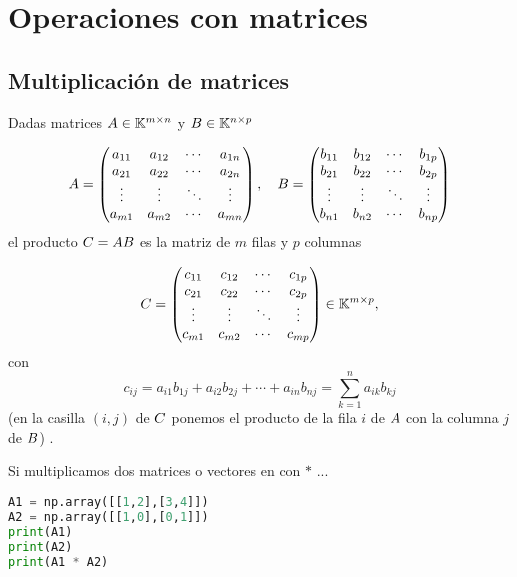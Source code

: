 \section{Operaciones con matrices}

\subsection{Multiplicación de matrices}

Dadas matrices $A \in \mathbb K^{m \times n}$ y $B \in \mathbb K^{n \times p}$

$$
\Ab =\begin{pmatrix}a_{11}&a_{12}&\cdots &a_{1n}\\a_{21}&a_{22}&\cdots &a_{2n}\\\vdots &\vdots &\ddots &\vdots \\a_{m1}&a_{m2}&\cdots &a_{mn}\\\end{pmatrix},\quad  {\Bb} ={\begin{pmatrix}b_{11}&b_{12}&\cdots &b_{1p}\\b_{21}&b_{22}&\cdots &b_{2p}\\\vdots &\vdots &\ddots &\vdots \\b_{n1}&b_{n2}&\cdots &b_{np}\\\end{pmatrix}}
$$ el producto $\Cb = \Ab\Bb$ es la matriz de $m$ filas y $p$ columnas

$$
\Cb =\begin{pmatrix}c_{11}&c_{12}&\cdots &c_{1p}\\c_{21}&c_{22}&\cdots &c_{2p}\\\vdots &\vdots &\ddots &\vdots \\c_{m1}&c_{m2}&\cdots &c_{mp}\\\end{pmatrix} \in \K^{m \times p},
$$
con
$$
c_{ij}=a_{i1}b_{1j}+a_{i2}b_{2j}+\cdots +a_{in}b_{nj}=\sum _{k=1}^{n}a_{ik}b_{kj}
$$
(en la casilla $(i,j)$ de $\Cb$ ponemos el producto de la fila $i$ de $\Ab$ con la columna $j$ de $\Bb$) .


Si multiplicamos dos matrices o vectores en \python con $*$ ...

\begin{Shaded}
\begin{lstlisting}[language=Python]
A1 = np.array([[1,2],[3,4]])
A2 = np.array([[1,0],[0,1]])
print(A1)
print(A2)
print(A1 * A2)
\end{lstlisting}
\end{Shaded}

